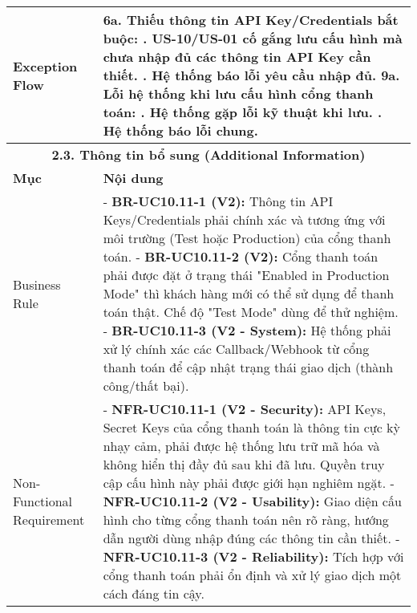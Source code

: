 \begin{longtable}{|m{4cm}|p{11cm}|}
\hline
Exception Flow & \textbf{6a. Thiếu thông tin API Key/Credentials bắt buộc:} \newline    1. US-10/US-01 cố gắng lưu cấu hình mà chưa nhập đủ các thông tin API Key cần thiết. \newline    2. Hệ thống báo lỗi yêu cầu nhập đủ. \newline \textbf{9a. Lỗi hệ thống khi lưu cấu hình cổng thanh toán:} \newline    1. Hệ thống gặp lỗi kỹ thuật khi lưu. \newline    2. Hệ thống báo lỗi chung. \\
\hline
\multicolumn{2}{|c|}{\textbf{2.3. Thông tin bổ sung (Additional Information)}} \\
\hline
\textbf{Mục} & \textbf{Nội dung} \\
\hline
Business Rule & - \textbf{BR-UC10.11-1 (V2):} Thông tin API Keys/Credentials phải chính xác và tương ứng với môi trường (Test hoặc Production) của cổng thanh toán. \newline - \textbf{BR-UC10.11-2 (V2):} Cổng thanh toán phải được đặt ở trạng thái "Enabled in Production Mode" thì khách hàng mới có thể sử dụng để thanh toán thật. Chế độ "Test Mode" dùng để thử nghiệm. \newline - \textbf{BR-UC10.11-3 (V2 - System):} Hệ thống phải xử lý chính xác các Callback/Webhook từ cổng thanh toán để cập nhật trạng thái giao dịch (thành công/thất bại). \\
\hline
Non-Functional Requirement & - \textbf{NFR-UC10.11-1 (V2 - Security):} API Keys, Secret Keys của cổng thanh toán là thông tin cực kỳ nhạy cảm, phải được hệ thống lưu trữ mã hóa và không hiển thị đầy đủ sau khi đã lưu. Quyền truy cập cấu hình này phải được giới hạn nghiêm ngặt. \newline - \textbf{NFR-UC10.11-2 (V2 - Usability):} Giao diện cấu hình cho từng cổng thanh toán nên rõ ràng, hướng dẫn người dùng nhập đúng các thông tin cần thiết. \newline - \textbf{NFR-UC10.11-3 (V2 - Reliability):} Tích hợp với cổng thanh toán phải ổn định và xử lý giao dịch một cách đáng tin cậy. \\
\hline
\end{longtable}

